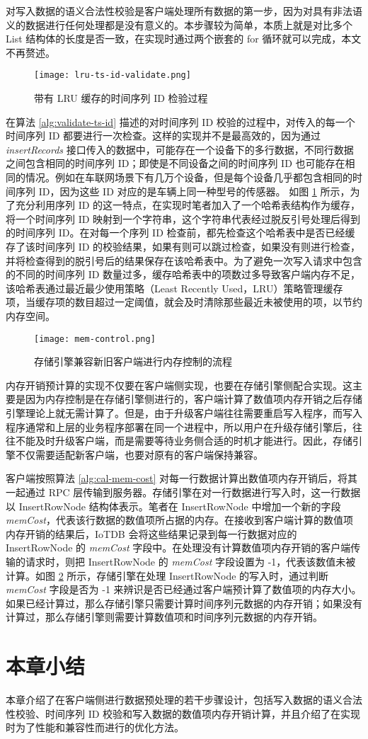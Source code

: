 对写入数据的语义合法性校验是客户端处理所有数据的第一步，因为对具有非法语义的数据进行任何处理都是没有意义的。本步骤较为简单，本质上就是对比多个 List 结构体的长度是否一致，在实现时通过两个嵌套的 for 循环就可以完成，本文不再赘述。

\begin{figure}
  \centering
  \texttt{[image: lru-ts-id-validate.png]}
  \caption{带有 LRU 缓存的时间序列 ID 检验过程}
  \label{fig:lru-ts-id-validate}
\end{figure}

在算法 \ref{alg:validate-ts-id} 描述的对时间序列 ID 校验的过程中，对传入的每一个时间序列 ID 都要进行一次检查。这样的实现并不是最高效的，因为通过 \emph{insertRecords} 接口传入的数据中，可能存在一个设备下的多行数据，不同行数据之间包含相同的时间序列 ID；即使是不同设备之间的时间序列 ID 也可能存在相同的情况。例如在车联网场景下有几万个设备，但是每个设备几乎都包含相同的时间序列 ID，因为这些 ID 对应的是车辆上同一种型号的传感器。 如图 \ref{fig:lru-ts-id-validate} 所示，为了充分利用序列 ID 的这一特点，在实现时笔者加入了一个哈希表结构作为缓存，将一个时间序列 ID 映射到一个字符串，这个字符串代表经过脱反引号处理后得到的时间序列 ID。在对每一个序列 ID 检查前，都先检查这个哈希表中是否已经缓存了该时间序列 ID 的校验结果，如果有则可以跳过检查，如果没有则进行检查，并将检查得到的脱引号后的结果保存在该哈希表中。为了避免一次写入请求中包含的不同的时间序列 ID 数量过多，缓存哈希表中的项数过多导致客户端内存不足，该哈希表通过最近最少使用策略（Least Recently Used，LRU）策略管理缓存项，当缓存项的数目超过一定阈值，就会及时清除那些最近未被使用的项，以节约内存空间。

\begin{figure}
  \centering
  \texttt{[image: mem-control.png]}
  \caption{存储引擎兼容新旧客户端进行内存控制的流程}
  \label{fig:mem-control-compatibility}
\end{figure}


内存开销预计算的实现不仅要在客户端侧实现，也要在存储引擎侧配合实现。这主要是因为内存控制是在存储引擎侧进行的，客户端计算了数值项内存开销之后存储引擎理论上就无需计算了。但是，由于升级客户端往往需要重启写入程序，而写入程序通常和上层的业务程序部署在同一个进程中，所以用户在升级存储引擎后，往往不能及时升级客户端，而是需要等待业务侧合适的时机才能进行。因此，存储引擎不仅需要适配新客户端，也要对原有的客户端保持兼容。


客户端按照算法 \ref{alg:cal-mem-cost} 对每一行数据计算出数值项内存开销后，将其一起通过 RPC 层传输到服务器。存储引擎在对一行数据进行写入时，这一行数据以 InsertRowNode 结构体表示。笔者在 InsertRowNode 中增加一个新的字段 \emph{memCost}，代表该行数据的数值项所占据的内存。在接收到客户端计算的数值项内存开销的结果后，IoTDB 会将这些结果记录到每一行数据对应的 InsertRowNode 的 \emph{memCost} 字段中。在处理没有计算数值项内存开销的客户端传输的请求时，则把 InsertRowNode 的 \emph{memCost} 字段设置为 -1，代表该数值未被计算。如图 \ref{fig:mem-control-compatibility} 所示，存储引擎在处理 InsertRowNode 的写入时，通过判断 \emph{memCost} 字段是否为 -1 来辨识是否已经通过客户端预计算了数值项的内存大小。如果已经计算过，那么存储引擎只需要计算时间序列元数据的内存开销；如果没有计算过，那么存储引擎则需要计算数值项和时间序列元数据的内存开销。

\section{本章小结}
本章介绍了在客户端侧进行数据预处理的若干步骤设计，包括写入数据的语义合法性校验、时间序列 ID 校验和写入数据的数值项内存开销计算，并且介绍了在实现时为了性能和兼容性而进行的优化方法。